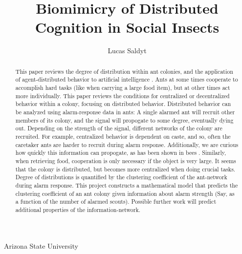 \documentclass{nature}
\title{Biomimicry of Distributed Cognition in Social Insects}
\author{Lucas Saldyt}
\begin{document}
\maketitle

\begin{affiliations}
 \item Arizona State University
\end{affiliations}

\begin{abstract}
    This paper reviews the degree of distribution\cite{saramaki2007generalizations} within ant colonies, and the application of agent-distributed behavior to artificial intelligence \cite{brabazon2016distributed, dorigo2011ant}.
    Ants at some times cooperate to accomplish hard tasks (like when carrying a large food item), but at other times act more individually\cite{feinerman2017individual}.
    This paper reviews the conditions for centralized or decentralized behavior within a colony, focusing on distributed behavior.
    Distributed behavior can be analyzed using alarm-response data in ants: A single alarmed ant will recruit other members of its colony, and the signal will propogate to some degree, eventually dying out.
    Depending on the strength of the signal, different networks of the colony are recruited.
    For example, centralized behavior is dependent on caste, and so, often the caretaker ants are harder to recruit during alarm response.
    Additionally, we are curious how quickly this information can propogate, as has been shown in bees \cite{gernat2018automated}. 
    Similarly, when retrieving food, cooperation is only necessary if the object is very large.
    It seems that the colony is distributed, but becomes more centralized when doing crucial tasks. 
    Degree of distributions is quantified by the clustering coefficient of the ant-network during alarm response.
    This project constructs a mathematical model that predicts the clustering coefficient of an ant colony given information about alarm strength (Say, as a function of the number of alarmed scouts). 
    Possible further work will predict additional properties of the information-network.


\end{abstract}
\end{document}
